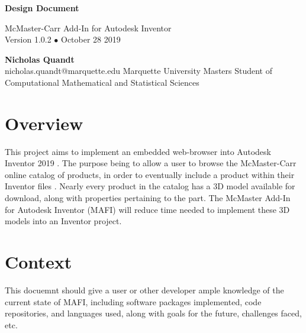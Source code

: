 \documentclass[12pt, letterpaper]{article}
\begin{document}
\begin{titlepage}
   \begin{flushright}
       \vspace*{5cm}
 
       {\Huge \textbf{Design Document}}
 
       \vspace{0.5cm}
        McMaster-Carr Add-In for Autodesk Inventor\\
        Version 1.0.2 $\bullet$ October 28 2019
 
       \vspace{1.5cm}
 
       \textbf{Nicholas Quandt}
       \\
       nicholas.quandt@marquette.edu
       \vfill
       Marquette University Masters Student of\\
       Computational Mathematical and Statistical Sciences\\
       \vspace{1cm}
 
   \end{flushright}
\end{titlepage}

\section{Overview}
This project aims to implement an embedded web-browser into Autodesk Inventor 2019 \cite{Inventor}. The purpose being 
to allow a user to browse the McMaster-Carr online catalog of products, in order to eventually
include a product within their Inventor files \cite{McMaster}. Nearly every product in the catalog has a 3D model
available for download, along with properties pertaining to the part. The McMaster Add-In for Autodesk Inventor (MAFI)
will reduce time needed to implement these 3D models into an Inventor project.
\section{Context}
This docuemnt should give a user or other developer ample knowledge of the current state of MAFI, including
software packages implemented, code repositories, and languages used, along with goals for the future, challenges faced, etc.
\end{document}

